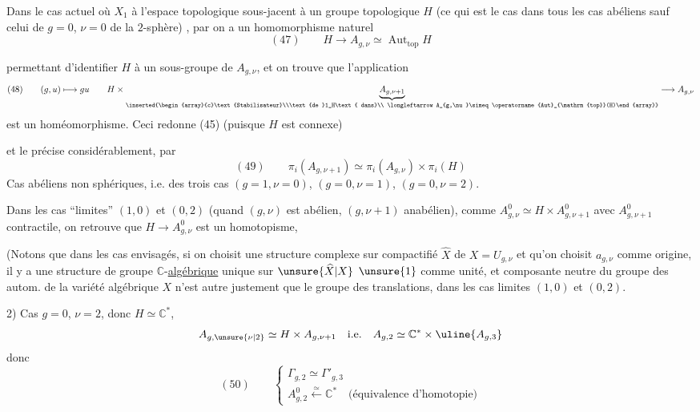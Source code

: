 Dans le cas actuel où  $X_1$   à l'espace topologique sous-jacent à un groupe topologique $H$ (ce qui est le cas dans tous les cas abéliens sauf celui de $g=0$, $\nu=0$ de la $2$-sphère) , par  on a un homomorphisme naturel
\[
(47)\qquad H\longrightarrow A_{g,\nu}\simeq\operatorname{Aut}_{\mathrm{top}}H
\]

permettant d'identifier $H$ à un sous-groupe  de $A_{g,\nu}$, et on trouve que l'application
\[
(48)\qquad (g,u)\longmapsto gu\qquad
H\times\underbrace{A_{g,\nu+1}}_{\inserted{\begin{array}{c}\text{Stabilisateur}\\\text{de }1_H\text{ dans}\\ \longleftarrow A_{g,\nu}\simeq\operatorname{Aut}_{\mathrm{top}}(H)\end{array}}}
\longrightarrow A_{g,\nu}
\]
est un homéomorphisme.  Ceci  redonne (45) (puisque $H$ est connexe)

et le précise considérablement, par
\[
(49)\qquad\pi_i(A_{g,\nu+1})\simeq\pi_i(A_{g,\nu})\times\pi_i(H)
\]
Cas abéliens non sphériques, i.e.  des trois cas $(g=1,\nu=0)$, $(g=0,\nu=1)$, $(g=0,\nu=2)$.

Dans les cas ``limites'' $(1,0)$ et $(0,2)$ (quand $(g,\nu)$ est abélien, $(g,\nu+1)$ anabélien), comme $A^0_{g,\nu}\simeq H\times A^0_{g,\nu+1}$ avec $A^0_{g,\nu+1}$ contractile, on retrouve que $H\longrightarrow A^0_{g,\nu}$ est un homotopisme, 

(Notons que dans les cas envisagés, si on choisit une structure complexe sur  compactifié  $\widehat X$ de $X=U_{g,\nu}$ et qu'on choisit $a_{g,\nu}$ comme origine, il y a une structure de groupe $\mathbb{C}$-\uline{algébrique} unique sur $\unsure{\widehat X|X}$  $\unsure{1}$ comme unité, et    composante neutre du groupe des autom. de la variété algébrique $X$ n'est autre justement que le groupe des translations, dans les cas limites $(1,0)$ et $(0,2)$.

2) Cas $g=0$, $\nu=2$, donc $H\simeq\mathbb{C}^*$,
\[
A_{g,\unsure{\nu|2}}\simeq H\times A_{g,\nu+1}\quad\text{i.e.}\quad A_{g,2}\simeq\mathbb{C}^*\times\uline{A_{g,3}}
\]
donc
\[
(50)\qquad\left\{\begin{array}{l}
\Gamma_{g,2}\simeq\Gamma'_{g,3}\\
A^0_{g,2}\xleftarrow{\simeq}\mathbb{C}^*\quad\text{(équivalence d'homotopie)}
\end{array}\right.
\]

